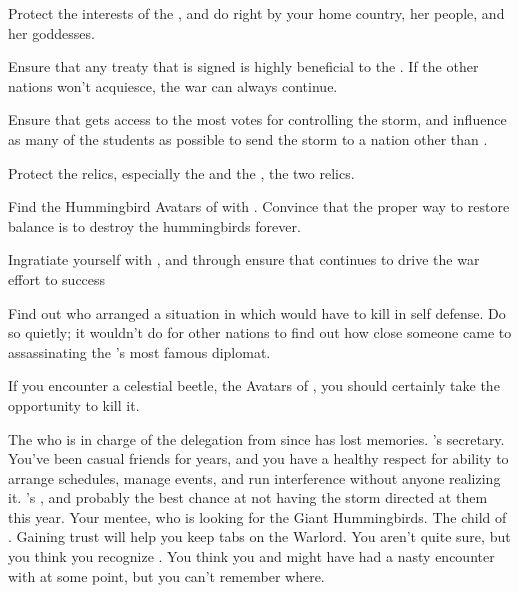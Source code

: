 \documentclass[char]{GL2020}
\begin{document}
\begin{itemz}[Goals]
	\item Protect the interests of the \pShip{}, and do right by your home country, her people, and her goddesses.
\item Ensure that any treaty that is signed is highly beneficial to the \pShippies{}. If the other nations won’t acquiesce, the war can always continue.
	\item Ensure that \cPresident{} gets access to the most votes for controlling the storm, and influence as many of the students as possible to send the storm to a nation other than \pShip{}.
	\item Protect the relics, especially the \iNet{} and the \iChalice{}, the two \pShip{} relics.
	\item Find the Hummingbird Avatars of \cFarmGod{} with \cDisney{}. Convince \cDisney{\them} that the proper way to restore balance is to destroy the hummingbirds forever.
	\item Ingratiate yourself with \cWarlordDaughter{}, and through \cWarlordDaughter{\them} ensure that \cLoud{} continues to drive the \pShip{} war effort to success
	\item Find out who arranged a situation in which \cHeadDiplomat{} would have to kill in self defense. Do so quietly; it wouldn’t do for other nations to find out how close someone came to assassinating the \pShip{}’s most famous diplomat.
\end{itemz}

\begin{itemz}[Notes]
	\item If you encounter a celestial beetle, the Avatars of \cTechGod{}, you should certainly take the opportunity to kill it.
\end{itemz}

\begin{contacts}
	\contact{\cEbbPriest{}} The \cEbb{} \cEbbPriest{\cleric} who is in charge of the delegation from \pShip{} since \cHeadDiplomat{} has lost \cHeadDiplomat{\their} memories.
	\contact{\cChupLeader{}} \cHeadDiplomat{}’s secretary. You’ve been casual friends for years, and you have a healthy respect for \cChupLeader{\their} ability to arrange schedules, manage events, and run interference without anyone realizing it.
	\contact{\cPresident{}} \cHeadDiplomat{}’s \cPresident{\nibling}, and probably the \pShippies{} best chance at not having the storm directed at them this year.
	\contact{\cDisney{}} Your mentee, who is looking for the Giant Hummingbirds.
	\contact{\cWarlordDaughter{}} The child of \cLoud{\full}. Gaining \cWarlordDaughter{\their} trust will help you keep tabs on the Warlord.
	\contact{\cEvil{}} You aren’t quite sure, but you think you recognize \cEvil{\them}. You think you and \cHeadDiplomat{} might have had a nasty encounter with \cEvil{\them} at some point, but you can’t remember where.
\end{contacts}
\end{document}
